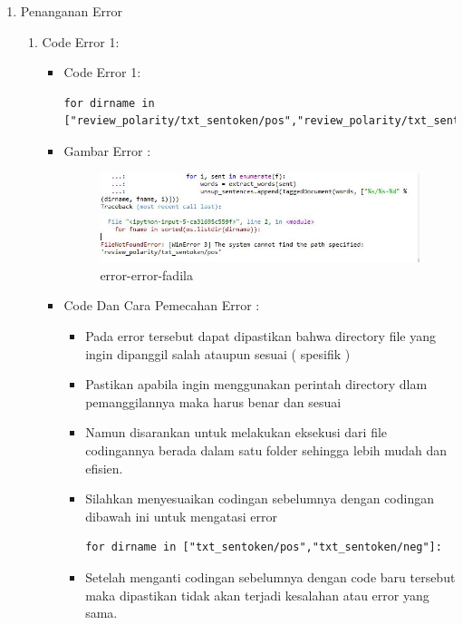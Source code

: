 \begin{enumerate}
\item Penanganan Error
\begin{enumerate}
\item Code Error 1:
\begin{itemize}
\item Code Error 1:
\begin{lstlisting}
for dirname in ["review_polarity/txt_sentoken/pos","review_polarity/txt_sentoken/neg"]:
\end{lstlisting}
\item Gambar Error :
\par
\begin{figure}[!hbtp]
\centering
\includegraphics[scale=0.3]{figures/error-error-fadila.jpg}
\caption{error-error-fadila}
\label{error-error-fadila}
\end{figure}
\par
\item Code Dan Cara Pemecahan Error :
\begin{itemize}
\item Pada error tersebut dapat dipastikan bahwa directory file yang ingin dipanggil salah ataupun sesuai ( spesifik )
\item Pastikan apabila ingin menggunakan perintah directory dlam pemanggilannya maka harus benar dan sesuai
\item Namun disarankan untuk melakukan eksekusi dari file codingannya  berada dalam satu folder sehingga lebih mudah dan efisien.
\item Silahkan menyesuaikan codingan sebelumnya dengan codingan dibawah ini untuk mengatasi error
\begin{lstlisting}
for dirname in ["txt_sentoken/pos","txt_sentoken/neg"]:
\end{lstlisting}
\item Setelah menganti codingan sebelumnya dengan code baru tersebut maka dipastikan tidak akan terjadi kesalahan atau error yang sama.
\par 
\par
\end{itemize}
\end{itemize}
\par

\end{enumerate}
\end{enumerate}
